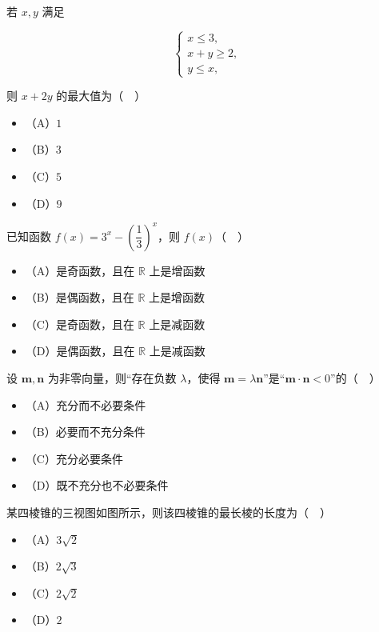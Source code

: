 \begin{question}
若 $x,y$ 满足

\nopagebreak[4]
\[
\begin{cases}
x\leqslant3,\\
x+y\geqslant2,\\
y\leqslant x,
\end{cases}
\]

则 $x+2y$ 的最大值为（　）

\begin{itemize}
\item （A）$1$
\item （B）$3$
\item （C）$5$
\item （D）$9$
\end{itemize}

\end{question}
\begin{question}
已知函数 $f(x)=3^x-\left(\dfrac13\right)^x$，则 $f(x)$（　）

\begin{itemize}
\item （A）是奇函数，且在 $\mathbb R$ 上是增函数
\item （B）是偶函数，且在 $\mathbb R$ 上是增函数
\item （C）是奇函数，且在 $\mathbb R$ 上是减函数
\item （D）是偶函数，且在 $\mathbb R$ 上是减函数
\end{itemize}

\end{question}
\begin{question}
设 $\boldsymbol m,\boldsymbol n$ 为非零向量，则“存在负数 $\lambda$，使得 $\boldsymbol m=\lambda\boldsymbol n$”是“$\boldsymbol m\cdot\boldsymbol n<0$”的（　）

\begin{itemize}
\item （A）充分而不必要条件
\item （B）必要而不充分条件
\item （C）充分必要条件
\item （D）既不充分也不必要条件
\end{itemize}

\Needspace{0.4\textheight}
\end{question}
\begin{question}
某四棱锥的三视图如图所示，则该四棱锥的最长棱的长度为（　）
\nopagebreak[4]
\begin{center}\end{center}
\nopagebreak[4]
\begin{itemize}
\item （A）$3\sqrt2$
\item （B）$2\sqrt3$
\item （C）$2\sqrt2$
\item （D）$2$
\end{itemize}

\end{question}
